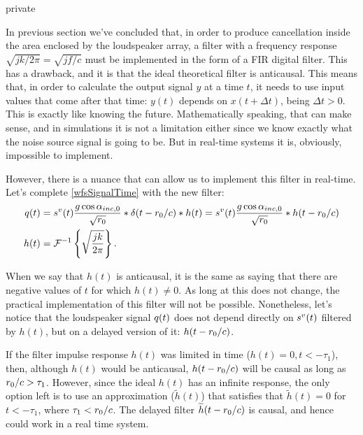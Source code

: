 \begin{shownto}{private}
\end{shownto}

In previous section we've concluded that, in order to produce cancellation inside the area enclosed by the loudspeaker array, a filter with a frequency response $\sqrt{jk/2\pi} = \sqrt{jf/c}$ must be implemented in the form of a FIR digital filter. This has a drawback, and it is that the ideal theoretical filter is anticausal. This means that, in order to calculate the output signal $y$ at a time $t$, it needs to use input values that come after that time: $y(t)$ depends on $x(t+\Delta t)$, being $\Delta t > 0$. This is exactly like knowing the future. Mathematically speaking, that can make sense, and in simulations it is not a limitation either since we know exactly what the noise source signal is going to be.
But in real-time systems it is, obviously, impossible to implement.

However, there is a nuance that can allow us to implement this filter in real-time. Let's complete \autoref{wfsSignalTime} with the new filter:
\begin{equation}
\begin{aligned}
\signal[wfs][time](t) &= \signal[nsVirt][time](t) \frac{g \cos\normPrimaryPropAngleSection}{\sqrt{\distLinePrimSource}}
\ast\delta(t - \distLinePrimSource/c)\ast h(t) = \signal[nsVirt][time](t) \frac{g \cos\normPrimaryPropAngleSection}{\sqrt{\distLinePrimSource}}
\ast h(t - \distLinePrimSource/c)\\
h(t) &= \FourierTransform{\sqrt{\frac{jk}{2\pi}}}[inverse].
\end{aligned}
\end{equation}

When we say that $h(t)$ is anticausal, it is the same as saying that there are negative values of $t$ for which $h(t) \neq 0$. As long at this does not change, the practical implementation of this filter will not be possible. Nonetheless, let's notice that the loudspeaker signal $\signal[wfs][time](t)$ does not depend directly on $\signal[nsVirt][time](t)$ filtered by $h(t)$, but on a delayed version of it: $h(t - r_0/c)$.

If the filter impulse response $h(t)$ was limited in time ($h(t) = 0, t < -\tau_1$), then, although $h(t)$ would be anticausal, $h(t - r_0/c)$ will be causal as long as $r_0/c > \tau_1$. However, since the ideal $h(t)$ has an infinite response, the only option left is to use an approximation ($\widetilde{h}(t)$) that satisfies that $\widetilde{h}(t) = 0$ for $t < -\tau_1$, where $\tau_1 < r_0/c$. The delayed filter $\widetilde{h}(t - r_0/c)$ is causal, and hence could work in a real time system.

